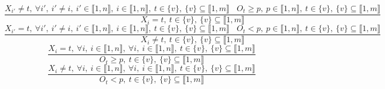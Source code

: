 $$\frac{X_{i'} \neq t,~\forall i',~i' \neq i,~i' \in \llbracket1,n\rrbracket,~i \in \llbracket1,n\rrbracket,~t \in \{v\},~\{v\} \subseteq \llbracket1,m\rrbracket~~~~O_{t} \geq p,~p \in \llbracket1,n\rrbracket,~t \in \{v\},~\{v\} \subseteq \llbracket1,m\rrbracket}{X_{i}=t,~t \in \{v\},~\{v\} \subseteq \llbracket1,m\rrbracket}$$ $$\frac{X_{i'}=t,~\forall i',~i' \neq i,~i' \in \llbracket1,n\rrbracket,~i \in \llbracket1,n\rrbracket,~t \in \{v\},~\{v\} \subseteq \llbracket1,m\rrbracket~~~~O_{t}<p,~p \in \llbracket1,n\rrbracket,~t \in \{v\},~\{v\} \subseteq \llbracket1,m\rrbracket}{X_{i} \neq t,~t \in \{v\},~\{v\} \subseteq \llbracket1,m\rrbracket}$$ $$\frac{X_{i}=t,~\forall i,~i \in \llbracket1,n\rrbracket,~\forall i,~i \in \llbracket1,n\rrbracket,~t \in \{v\},~\{v\} \subseteq \llbracket1,m\rrbracket}{O_{t} \geq p,~t \in \{v\},~\{v\} \subseteq \llbracket1,m\rrbracket}$$ $$\frac{X_{i} \neq t,~\forall i,~i \in \llbracket1,n\rrbracket,~\forall i,~i \in \llbracket1,n\rrbracket,~t \in \{v\},~\{v\} \subseteq \llbracket1,m\rrbracket}{O_{t}<p,~t \in \{v\},~\{v\} \subseteq \llbracket1,m\rrbracket}$$ 
